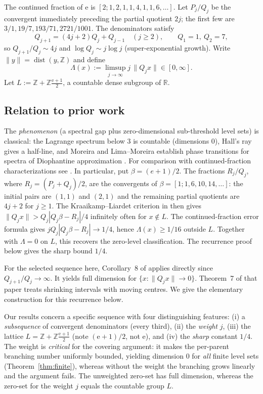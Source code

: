 \documentclass[11pt]{article}
\theoremstyle{definition}
\theoremstyle{remark}
\newcommand{\R}{\mathbb{R}}
\newcommand{\Z}{\mathbb{Z}}
\newcommand{\ee}{\mathrm{e}}
\newcommand{\dist}{\operatorname{dist}}
\newcommand{\Lam}{\Lambda}
\begin{document}
The continued fraction of $\ee$ is $[2;1,2,1,1,4,1,1,6,\dots]$. Let $P_j/Q_j$
be the convergent immediately preceding the partial quotient $2j$; the first
few are $3/1,19/7,193/71,2721/1001$. The denominators satisfy
\begin{equation}\label{eq:rec}
Q_{j+1}=(4j+2)Q_j+Q_{j-1}\quad(j\ge2),\qquad Q_1=1,\ Q_2=7,
\end{equation}
so $Q_{j+1}/Q_j\sim 4j$ and $\log Q_j\sim j\log j$ (super-exponential growth).
Write $\|y\|=\dist(y,\Z)$ and define
\[
\Lam(x):=\limsup_{j\to\infty} j\,\|Q_j x\|\in[0,\infty].
\]
Let $L:=\Z+\Z\frac{\ee+1}{2}$, a countable dense subgroup of $\R$.

\subsection{Relation to prior work}\label{sec:prior}

The \emph{phenomenon} (a spectral gap plus zero-dimensional sub-threshold level
sets) is classical: the Lagrange spectrum below $3$ is countable
(dimensions $0$), Hall's ray gives a half-line, and Moreira and Lima--Moreira
establish phase transitions for spectra of Diophantine approximation
\cite{Moreira,LimaMoreira}. For comparison with continued-fraction characterizations see
\cite{KL,BDS}. In particular, put $\beta=(e+1)/2$. The fractions
$R_j/Q_j$, where $R_j=(P_j+Q_j)/2$, are the convergents of
$\beta=[1;1,6,10,14,\ldots]$: the initial pairs are $(1,1)$ and
$(2,1)$ and the remaining partial quotients are $4j+2$ for $j\ge1$.
The Kraaikamp--Liardet criterion in \cite[p.~106, Lem.~4.1]{BDS} then
gives $\|Q_jx\|>Q_j|Q_j\beta-R_j|/4$ infinitely often for $x\notin L$.
The continued-fraction error formula gives
$jQ_j|Q_j\beta-R_j|\to1/4$, hence $\Lambda(x)\ge1/16$ outside $L$.
Together with $\Lambda=0$ on $L$, this recovers the zero-level
classification. The recurrence proof below gives the sharp bound $1/4$.

For the selected sequence here, Corollary~8 of \cite{BLR}
applies directly since $Q_{j+1}/Q_j\to\infty$. It yields full dimension
for $\{x:\|Q_jx\|\to0\}$. Theorem~7 of that paper treats shrinking
intervals with moving centres. We give the elementary construction
for this recurrence below.

Our results concern a specific sequence with four distinguishing
features: (i) a \emph{subsequence} of convergent denominators (every third),
(ii) the \emph{weight} $j$, (iii) the lattice $L=\Z+\Z\frac{\ee+1}{2}$ (note
$(\ee+1)/2$, not $\ee$), and (iv) the \emph{sharp} constant $1/4$. The weight is
\emph{critical} for the covering argument: it makes the per-parent branching
number uniformly bounded, yielding dimension $0$ for \emph{all} finite level
sets (Theorem~\ref{thm:finite}), whereas without the weight the branching grows
linearly and the argument fails. The unweighted zero-set has full dimension, whereas the zero-set
for the weight $j$ equals the countable group $L$.
\end{document}
